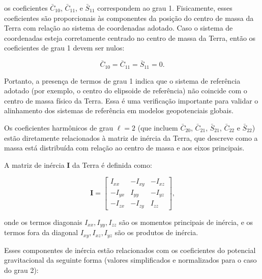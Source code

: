 \noindent
os coeficientes \( \bar{C}_{10} \), \( \bar{C}_{11} \), e \( \bar{S}_{11} \) correspondem ao grau 1. Fisicamente, esses coeficientes são proporcionais às componentes da posição do centro de massa da Terra com relação ao sistema de coordenadas adotado. Caso o sistema de coordenadas esteja corretamente centrado no centro de massa da Terra, então os coeficientes de grau 1 devem ser nulos:

\[
\bar{C}_{10} = \bar{C}_{11} = \bar{S}_{11} = 0 \text{.}
\]

\noindent
Portanto, a presença de termos de grau 1 indica que o sistema de referência adotado (por exemplo, o centro do elipsoide de referência) não coincide com o centro de massa físico da Terra. Essa é uma verificação importante para validar o alinhamento dos sistemas de referência em modelos geopotenciais globais.

Os coeficientes harmônicos de grau \( \ell = 2 \) (que incluem \( \bar{C}_{20} \), \( \bar{C}_{21} \), \( \bar{S}_{21} \), \( \bar{C}_{22} \) e \( \bar{S}_{22} \)) estão diretamente relacionados à matriz de inércia da Terra, que descreve como a massa está distribuída com relação ao centro de massa e aos eixos principais.

A matriz de inércia \( \mathbf{I} \) da Terra é definida como:

\[
\mathbf{I} = 
\begin{bmatrix}
I_{xx} & -I_{xy} & -I_{xz} \\
-I_{yx} & I_{yy} & -I_{yz} \\
-I_{zx} & -I_{zy} & I_{zz}
\end{bmatrix}
\text{,}
\]

\noindent
onde os termos diagonais \( I_{xx}, I_{yy}, I_{zz} \) são os momentos principais de inércia, e os termos fora da diagonal \( I_{xy}, I_{xz}, I_{yz} \) são os produtos de inércia.

Esses componentes de inércia estão relacionados com os coeficientes do potencial gravitacional da seguinte forma (valores simplificados e normalizados para o caso do grau 2):

